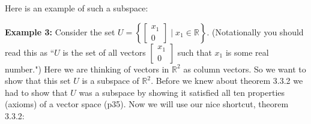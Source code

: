 \documentclass[12pt]{article}
\begin{document}
Here is an example of such a subspace:

{\bf Example 3:}  Consider the set $U=\left \{ \left[ \begin{array}{c} x_1  \\ 0  \end{array} \right] \mid x_1 \in \mathbb{R} \right \}$. (Notationally you should read this as ``$U$ is the set of all vectors $\left[ \begin{array}{c} x_1  \\ 0  \end{array} \right]$ such that $x_1$ is some real number.") Here we are thinking of vectors in $\mathbb{R}^2$ as column vectors.  So we want to show that this set $U$ is a subspace of $\mathbb{R}^2$.  Before we knew about theorem 3.3.2 we had to show that $U$ was a subspace by showing it satisfied all ten properties (axioms) of a vector space (p35).  Now we will use our nice shortcut, theorem 3.3.2:
\end{document}

